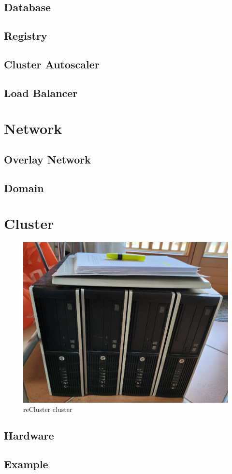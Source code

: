 \subsection{Database}
\label{subsec:architecture_components_database}

\subsection{Registry}
\label{subsec:architecture_components_registry}

\subsection{Cluster Autoscaler}
\label{subsec:architecture_components_cluster_autoscaler}

\subsection{Load Balancer}
\label{subsec:architecture_components_load_balancer}

\section{Network}
\label{sec:architecture_network}

\subsection{Overlay Network}
\label{subsec:architecture_network_overlay_network}

\subsection{Domain}
\label{subsec:architecture_network_domain}

\section{Cluster}
\label{sec:architecture_cluster}

\begin{figure}
  \centering
  \includegraphics[width=.5\textwidth]{images/recluster/cluster.png}
  \caption{reCluster cluster}
\end{figure}

\subsection{Hardware}
\label{subsec:architecture_cluster_hardware}


\subsection{Example}
\label{subsec:architecture_cluster_example}

